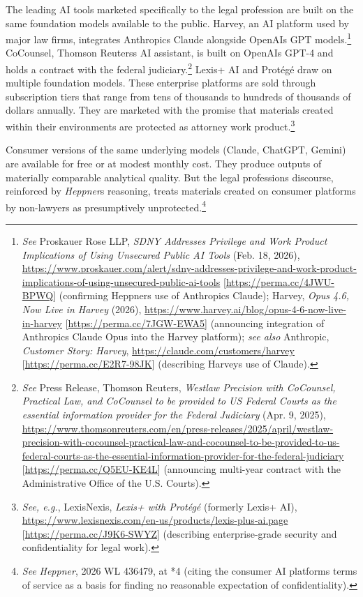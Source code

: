 \documentclass[
  12pt,
]{article}
\begin{document}
The leading AI tools marketed specifically to the legal profession are
built on the same foundation models available to the public. Harvey, an
AI platform used by major law firms, integrates
Anthropic\textquotesingle s Claude alongside OpenAI\textquotesingle s
GPT models.\footnote{\emph{See} Proskauer Rose LLP, \emph{SDNY Addresses
  Privilege and Work Product Implications of Using Unsecured Public AI
  Tools} (Feb. 18, 2026),
  \url{https://www.proskauer.com/alert/sdny-addresses-privilege-and-work-product-implications-of-using-unsecured-public-ai-tools}
  {[}\url{https://perma.cc/4JWU-BPWQ}{]} (confirming
  Heppner\textquotesingle s use of Anthropic\textquotesingle s Claude);
  Harvey, \emph{Opus 4.6, Now Live in Harvey} (2026),
  \url{https://www.harvey.ai/blog/opus-4-6-now-live-in-harvey}
  {[}\url{https://perma.cc/7JGW-EWA5}{]} (announcing integration of
  Anthropic\textquotesingle s Claude Opus into the Harvey platform);
  \emph{see also} Anthropic, \emph{Customer Story: Harvey},
  \url{https://claude.com/customers/harvey}
  {[}\url{https://perma.cc/E2R7-98JK}{]} (describing
  Harvey\textquotesingle s use of Claude).} CoCounsel, Thomson
Reuters\textquotesingle s AI assistant, is built on
OpenAI\textquotesingle s GPT-4 and holds a contract with the federal
judiciary.\footnote{\emph{See} Press Release, Thomson Reuters,
  \emph{Westlaw Precision with CoCounsel, Practical Law, and CoCounsel
  to be provided to US Federal Courts as the essential information
  provider for the Federal Judiciary} (Apr. 9, 2025),
  \url{https://www.thomsonreuters.com/en/press-releases/2025/april/westlaw-precision-with-cocounsel-practical-law-and-cocounsel-to-be-provided-to-us-federal-courts-as-the-essential-information-provider-for-the-federal-judiciary}
  {[}\url{https://perma.cc/Q5EU-KE4L}{]} (announcing multi-year contract
  with the Administrative Office of the U.S. Courts).} Lexis+ AI and
Protégé draw on multiple foundation models. These enterprise platforms
are sold through subscription tiers that range from tens of thousands to
hundreds of thousands of dollars annually. They are marketed with the
promise that materials created within their environments are protected
as attorney work product.\footnote{\emph{See, e.g.}, LexisNexis,
  \emph{Lexis+ with Protégé} (formerly Lexis+ AI),
  \url{https://www.lexisnexis.com/en-us/products/lexis-plus-ai.page}
  {[}\url{https://perma.cc/J9K6-SWYZ}{]} (describing enterprise-grade
  security and confidentiality for legal work).}

Consumer versions of the same underlying models (Claude, ChatGPT,
Gemini) are available for free or at modest monthly cost. They produce
outputs of materially comparable analytical quality. But the legal
profession\textquotesingle s discourse, reinforced by
\emph{Heppner}\textquotesingle s reasoning, treats materials created on
consumer platforms by non-lawyers as presumptively
unprotected.\footnote{\emph{See} \emph{Heppner}, 2026 WL 436479, at *4
  (citing the consumer AI platform\textquotesingle s terms of service as
  a basis for finding no reasonable expectation of confidentiality).}
\end{document}
